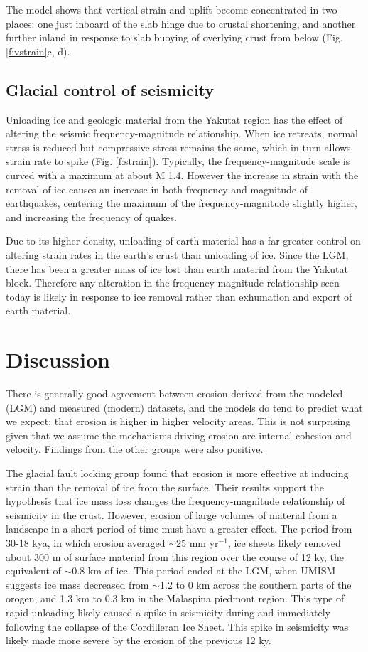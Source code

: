 \documentclass[twocolumn]{aastex6}
\begin{document}
		The model shows that vertical strain and uplift become concentrated in two places: one just inboard of the slab hinge due to crustal shortening, and another further inland in response to slab buoying of overlying crust from below (Fig. \ref{f:vstrain}c, d).

	\subsection{Glacial control of seismicity}
		Unloading ice and geologic material from the Yakutat region has the effect of altering the seismic frequency-magnitude relationship. When ice retreats, normal stress is reduced but compressive stress remains the same, which in turn allows strain rate to spike (Fig. \ref{f:strain}). Typically, the frequency-magnitude scale is curved with a maximum at about M 1.4. However the increase in strain with the removal of ice causes an increase in both frequency and magnitude of earthquakes, centering the maximum of the frequency-magnitude slightly higher, and increasing the frequency of quakes.
		
		Due to its higher density, unloading of earth material has a far greater control on altering strain rates in the earth's crust than unloading of ice. Since the LGM, there has been a greater mass of ice lost than earth material from the Yakutat block. Therefore any alteration in the frequency-magnitude relationship seen today is likely in response to ice removal rather than exhumation and export of earth material.

	\section{Discussion}
		There is generally good agreement between erosion derived from the modeled (LGM) and measured (modern) datasets, and the models do tend to predict what we expect: that erosion is higher in higher velocity areas. This is not surprising given that we assume the mechanisms driving erosion are internal cohesion and velocity. Findings from the other groups were also positive.

		The glacial fault locking group found that erosion is more effective at inducing strain than the removal of ice from the surface. Their results support the hypothesis that ice mass loss changes the frequency-magnitude relationship of seismicity in the crust. However, erosion of large volumes of material from a landscape in a short period of time must have a greater effect. The period from 30-18 kya, in which erosion averaged $\sim$25 mm yr$^{-1}$, ice sheets likely removed about 300 m of surface material from this region over the course of 12 ky, the equivalent of $\sim$0.8 km of ice. This period ended at the LGM, when UMISM suggests ice mass decreased from $\sim$1.2 to 0 km across the southern parts of the orogen, and 1.3 km to 0.3 km in the Malaspina piedmont region. This type of rapid unloading likely caused a spike in seismicity during and immediately following the collapse of the Cordilleran Ice Sheet. This spike in seismicity was likely made more severe by the erosion of the previous 12 ky.
\end{document}

